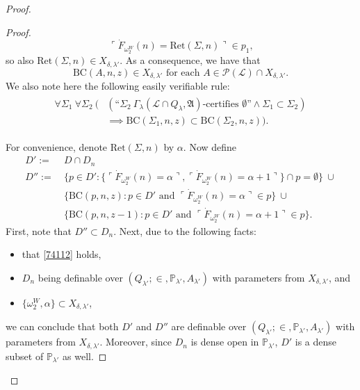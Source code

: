 \documentclass[12pt, twoside]{memoir}
\numberwithin{equation}{section}
\theoremstyle{definition}
\theoremstyle{remark}
\theoremstyle{definition}
\theoremstyle{definition}
\theoremstyle{definition}
\theoremstyle{remark}
\begin{document}
\begin{proof}
\begin{proof}
\begin{equation*}
    \ulcorner \dot{F}_{\omega_2^W}(n) = \mathrm{Ret}(\Sigma, n) \urcorner \in p_1 \text{,}
\end{equation*}
so also $\mathrm{Ret}(\Sigma, n) \in X_{\delta, \lambda'}$. As a consequence, we have that
\begin{equation}\label{eq742}
    \mathrm{BC}(A, n, z) \in X_{\delta, \lambda'} \text{ for each } A \in \mathcal{P}(\mathcal{L}) \cap X_{\delta, \lambda'} \text{.}
\end{equation}
We also note here the following easily verifiable rule: 
\begin{align}\label{eq742'}
\begin{split}
    \forall \Sigma_1 \ \forall \Sigma_2 \ (&(\text{``}\Sigma_2 \ \Gamma_{\lambda} (\mathcal{L} \cap Q_{\lambda}, \mathfrak{A}) \text{-certifies } \emptyset \text{''} \wedge \Sigma_1 \subset \Sigma_2) \\
    & \implies \mathrm{BC}(\Sigma_1, n, z) \subset \mathrm{BC}(\Sigma_2, n, z)) \text{.}
\end{split}
\end{align}

For convenience, denote $\mathrm{Ret}(\Sigma, n)$ by $\alpha$. Now define
\begin{align*}
    D' := \ & D \cap D_n \\
    D'' := \ & \{p \in D' : \{\ulcorner \dot{F}_{\omega_2^W}(n) = \alpha \urcorner, \ulcorner \dot{F}_{\omega_2^W}(n) = \alpha + 1\urcorner\} \cap p = \emptyset\} \  \cup \\
    & \{\mathrm{BC}(p, n, z) : p \in D' \text{ and } \ulcorner \dot{F}_{\omega_2^W}(n) = \alpha \urcorner \in p\} \ \cup \\
    & \{\mathrm{BC}(p, n, z-1) : p \in D' \text{ and } \ulcorner \dot{F}_{\omega_2^W}(n) = \alpha + 1 \urcorner \in p\} \text{.}
\end{align*}
First, note that $D'' \subset D_n$. Next, due to the following facts:
\begin{itemize}
    \item that \ref{74112} holds,
    \item $D_n$ being definable over $(Q_{\lambda'}; \in, \mathbb{P}_{\lambda'}, A_{\lambda'})$ with parameters from $X_{\delta, \lambda'}$, and
    \item $\{\omega_2^W, \alpha\} \subset X_{\delta, \lambda'}$, 
\end{itemize}
we can conclude that both $D'$ and $D''$ are definable over $(Q_{\lambda'}; \in, \mathbb{P}_{\lambda'}, A_{\lambda'})$ with parameters from $X_{\delta, \lambda'}$. Moreover, since $D_n$ is dense open in $\mathbb{P}_{\lambda'}$, $D'$ is a dense subset of $\mathbb{P}_{\lambda'}$ as well.


\end{proof}
\end{proof}
\end{document}
